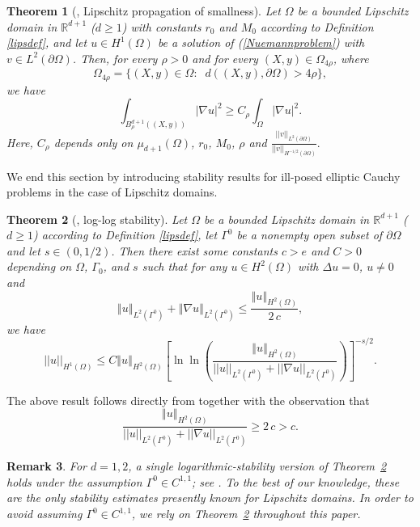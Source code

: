 \documentclass[11pt]{article}
\newtheorem{theorem}{Theorem}
\newtheorem{remark}[theorem]{Remark}
\begin{document}
\begin{theorem}[\cite{alessandrini2000optimal}, Lipschitz propagation of smallness]\label{propagationsmallnes}
	Let $\Omega$ be a bounded Lipschitz domain in $\mathbb{R}^{d+1}$ ($d\ge 1$) with constants $r_0$ and $M_0$ according to  Definition \ref{lipsdef}, and let $u\in H^{1}(\Omega)$ be a solution of (\ref{Nuemannproblem}) with $v\in L^2(\partial \Omega)$. Then, for every $\rho>0$ and for every $(X,y)\in\Omega_{4\rho}$, where 
	$$\Omega_{4\rho}=\{ (X,y)\in \Omega:\;\; d((X,y),\partial \Omega)>4\rho\},$$
	we have
	\begin{equation}\label{equaLipschprop}
		\displaystyle\int_{B^{d+1}_{\rho}((X,y))}|\nabla u|^2\geq C_{\rho} \displaystyle\int_{\Omega} |\nabla u|^2.
	\end{equation}
	Here, $C_{\rho}$ depends only on $\mu_{d+1}(\Omega)$, $r_0$, $M_0$, $\rho$ and $\frac{||v ||_{L^{2}(\partial\Omega)}}{||v ||_{H^{-1/2}(\partial\Omega)}}.$   
\end{theorem}

We end this section by introducing stability results for ill-posed
elliptic Cauchy problems in the case of Lipschitz
domains. 
\begin{theorem} [\cite{choulli2020new}, log-log stability]\label{loglogstability}
	Let $\Omega$ be a bounded Lipschitz domain in  $\mathbb{R}^{d+1}$  ($d\ge 1$) according to  Definition \ref{lipsdef}, 
	let $\Gamma^0$ be a nonempty open subset of $\partial \Omega$ and let $s\in(0,1/2)$. 
	Then there exist some constants $c>e$ and $C>0$ 
	depending on $\Omega$, $\Gamma _0$, and $s$ such that for any $u\in H^2(\Omega)$ with $\Delta u=0$, $u\ne 0$ and 
	$$ \left\Vert u \right\Vert_{L^2(\Gamma^0)}+\left\Vert \nabla u \right\Vert_{L^2(\Gamma^0)}\leq \frac{\left\Vert u \right\Vert_{H^2(\Omega)}}{2\,c},$$ 
	we have 
	$$||u||_{H^1(\Omega)}\leq C \left\Vert u \right\Vert_{H^2(\Omega)} \left[  \ln\ln\left(   \dfrac{\left\Vert u \right\Vert_{H^2(\Omega)}}{||u||_{L^2(\Gamma^0)}+||\nabla u||_{L^2(\Gamma^0)}}     \right)      \right]^{-s/2}.
	$$
\end{theorem}
The above result follows directly from \cite[Corollary 2]{choulli2020new} together with the observation that $$\dfrac{\left\Vert u \right\Vert_{H^2(\Omega)}}{||u||_{L^2(\Gamma^0)}+||\nabla u||_{L^2(\Gamma^0)}}\geq 2 \, c>c.$$

\begin{remark}\label{log stability result}
    For $d=1,2$, a single logarithmic-stability version of Theorem~\ref{loglogstability} holds under the assumption $\Gamma^0 \in C^{1,1}$; see \cite[Theorem~2]{bourgeois2010about}. To the best of our knowledge, these are the only stability estimates presently known for Lipschitz domains. In order to avoid assuming $\Gamma^0\in C^{1,1}$, we rely on Theorem~\ref{loglogstability} throughout this paper.
\end{remark}
\end{document}
